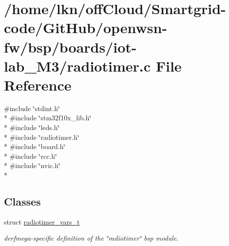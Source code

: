 \hypertarget{iot-lab___m3_2radiotimer_8c}{}\section{/home/lkn/off\+Cloud/\+Smartgrid-\/code/\+Git\+Hub/openwsn-\/fw/bsp/boards/iot-\/lab\+\_\+\+M3/radiotimer.c File Reference}
\label{iot-lab___m3_2radiotimer_8c}
{\ttfamily \#include \char`\"{}stdint.\+h\char`\"{}}\\*
{\ttfamily \#include \char`\"{}stm32f10x\+\_\+lib.\+h\char`\"{}}\\*
{\ttfamily \#include \char`\"{}leds.\+h\char`\"{}}\\*
{\ttfamily \#include \char`\"{}radiotimer.\+h\char`\"{}}\\*
{\ttfamily \#include \char`\"{}board.\+h\char`\"{}}\\*
{\ttfamily \#include \char`\"{}rcc.\+h\char`\"{}}\\*
{\ttfamily \#include \char`\"{}nvic.\+h\char`\"{}}\\*
\subsection*{Classes}
\begin{DoxyCompactItemize}
\item 
struct \hyperlink{structradiotimer__vars__t}{radiotimer\+\_\+vars\+\_\+t}
\begin{DoxyCompactList}\small\item\em derfmega-\/specific definition of the \char`\"{}radiotimer\char`\"{} bsp module. \end{DoxyCompactList}\end{DoxyCompactItemize}
